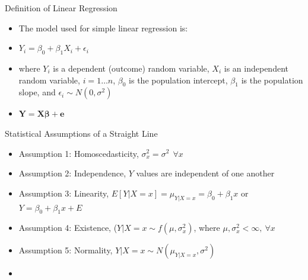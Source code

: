 \documentclass[handout,x11names,unknownkeysallowed]{beamer}
\makeatletter
\newcommand{\beamitem}{\begin{itemize}[<+-|alert@+>]}
\makeatother
\begin{document}
\begin{frame}
Definition of Linear Regression
\beamitem
\item The model used for simple linear regression is:
\item $Y_i = \beta_0 + \beta_1 X_i + \epsilon_i$
\item where $Y_i$ is a dependent (outcome) random variable, $X_i$ is an independent random variable,  $i=1\ldots n$, $\beta_0$ is the population intercept, $\beta_1$ is the population slope, and $\epsilon_i \sim N(0,\sigma^2)$
\item $\bm{Y} = \bm{X\beta} + \bm{e}$
\end{itemize}
\end{frame}

\begin{frame}
Statistical Assumptions of a Straight Line 

\beamitem
\item Assumption 1: Homoscedasticity, $\sigma_x^2=\sigma^2~~\forall x$
\item Assumption 2: Independence, $Y$ values are independent of one another
\item Assumption 3: Linearity, $E[Y|X=x] = \mu_{Y|X=x} = \beta_0 + \beta_1 x$ or $Y = \beta_0 + \beta_1 x + E$
\item Assumption 4: Existence, ($Y|X=x \sim f(\mu, \sigma_x^2)$, where $\mu,\sigma_x^2 < \infty, ~ \forall x$
\item Assumption 5: Normality, $Y|X=x \sim N(\mu_{Y|X=x},\sigma^2)$

\item 
\end{itemize}
\end{frame}
\end{document}

